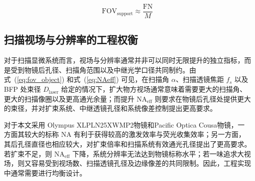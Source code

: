 \begin{equation}
  \mathrm{FOV}_{\mathrm{support}}\approx \frac{\mathrm{FN}}{M}
  \label{eq:fov_support}
\end{equation}





\subsection{扫描视场与分辨率的工程权衡}\label{2.4.4}

对于扫描显微系统而言，视场与分辨率通常并非可以同时无限提升的独立指标，而是受到物镜后孔径、扫描角范围以及中继光学口径共同制约。由式~(\ref{eq:fov_object}) 和式~(\ref{eq:NAeff}) 可见，在扫描角 $\alpha$、扫描透镜焦距 $f_s$ 以及 BFP 处束径 $D_{\mathrm{laser}}$ 给定的情况下，扩大物方视场通常意味着需要更大的扫描角、更大的扫描像圈以及更高通光余量；而提升 $\mathrm{NA}_{\mathrm{eff}}$ 则要求在物镜后孔径处提供更大的束径，并对扩束系统、中继透镜孔径和系统像差控制提出更高要求。

对于本文采用 Olympus XLPLN25XWMP2物镜和Pacific Optica Cousa物镜\cite{RN1262}，一方面其较大的标称 NA 有利于获得较高的激发效率与荧光收集效率；另一方面，其后孔径直径也相应较大，对扩束倍率和扫描系统有效通光孔径提出了更高要求。若扩束不足，则 $\mathrm{NA}_{\mathrm{eff}}$ 下降，系统分辨率无法达到物镜标称水平；若一味追求大视场，则又容易受到视场数、扫描透镜孔径及边缘像差的共同限制。因此，工程实现中通常需要进行均衡设计。

